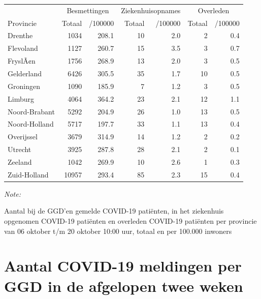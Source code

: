\documentclass[
  english,
  man,floatsintext]{apa6}
\begin{document}
\begin{table}
\centering
\begin{threeparttable}
\begin{tabular}{lrrrrrr}
\toprule
\multicolumn{1}{c}{ } & \multicolumn{2}{c}{Besmettingen} & \multicolumn{2}{c}{Ziekenhuisopnames} & \multicolumn{2}{c}{Overleden} \\
\cmidrule(l{3pt}r{3pt}){2-3} \cmidrule(l{3pt}r{3pt}){4-5} \cmidrule(l{3pt}r{3pt}){6-7}
Provincie & Totaal & /100000 & Totaal & /100000 & Totaal & /100000\\
\midrule
Drenthe & 1034 & 208.1 & 10 & 2.0 & 2 & 0.4\\
Flevoland & 1127 & 260.7 & 15 & 3.5 & 3 & 0.7\\
FryslÃ¢n & 1756 & 268.9 & 13 & 2.0 & 3 & 0.5\\
Gelderland & 6426 & 305.5 & 35 & 1.7 & 10 & 0.5\\
Groningen & 1090 & 185.9 & 7 & 1.2 & 3 & 0.5\\
Limburg & 4064 & 364.2 & 23 & 2.1 & 12 & 1.1\\
Noord-Brabant & 5292 & 204.9 & 26 & 1.0 & 13 & 0.5\\
Noord-Holland & 5717 & 197.7 & 33 & 1.1 & 13 & 0.4\\
Overijssel & 3679 & 314.9 & 14 & 1.2 & 2 & 0.2\\
Utrecht & 3925 & 287.8 & 28 & 2.1 & 2 & 0.1\\
Zeeland & 1042 & 269.9 & 10 & 2.6 & 1 & 0.3\\
Zuid-Holland & 10957 & 293.4 & 85 & 2.3 & 15 & 0.4\\
\bottomrule
\end{tabular}
\begin{tablenotes}
\item \textit{Note: } 
\item Aantal bij de GGD’en gemelde COVID-19 patiënten, in het ziekenhuis opgenomen COVID-19 patiënten en overleden COVID-19 patiënten per provincie van 06 oktober t/m 20 oktober 10:00 uur, totaal en per 100.000 inwoners
\end{tablenotes}
\end{threeparttable}
\end{table}

\newpage

\hypertarget{aantal-covid-19-meldingen-per-ggd-in-de-afgelopen-twee-weken}{%
\section{Aantal COVID-19 meldingen per GGD in de afgelopen twee weken}\label{aantal-covid-19-meldingen-per-ggd-in-de-afgelopen-twee-weken}}
\end{document}

